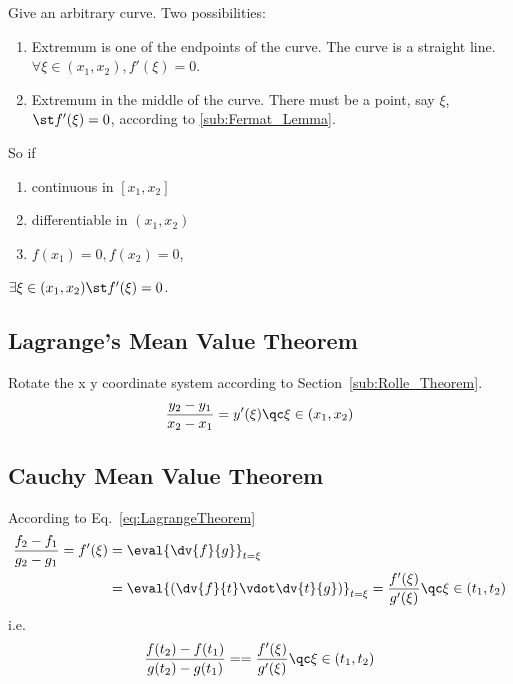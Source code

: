 Give an arbitrary curve. Two possibilities:
\begin{enumerate}
	\item Extremum is one of the endpoints of the curve. The curve is a straight line. \( \forall \xi \in (x_1, x_2), f'(\xi) = 0 \).
	\item Extremum in the middle of the curve. There must be a point, say \( \xi \), \( \st f'(\xi) = 0 \), according to \cref{sub:Fermat_Lemma}.
\end{enumerate}

So if 
\begin{enumerate}
	\item continuous in \( [x_1, x_2] \) 
	\item differentiable in \( (x_1, x_2) \) 
	\item \( f(x_1) = 0, f(x_2) = 0 \),
\end{enumerate}
\( \exists \xi \in (x_1, x_2) \st f'(\xi) = 0 \).
\subsection{Lagrange's Mean Value Theorem}%
Rotate the x y coordinate system according to Section~\ref{sub:Rolle_Theorem}.
\begin{equation}
	\frac{y_2 - y_1}{x_2 - x_1} = y'(\xi) \qc \xi \in (x_1, x_2) %
	\label{eq:LagrangeTheorem}
\end{equation}


\subsection{Cauchy Mean Value Theorem}%
	According to Eq.~\eqref{eq:LagrangeTheorem} 
\begin{equation*}
\begin{aligned}
	\frac{f_2 - f_1}{g_2 - g_1} = f'(\xi) &= \eval{\dv{f}{g}}_{t = \xi} \\ %
	&= \eval{\left(\dv{f}{t} \vdot
	\dv{t}{g}\right)}_{t = \xi} 
	= \frac{f'(\xi)}{g'(\xi)}
	\qc \xi \in (t_1,t_2)
\end{aligned}
\end{equation*}
i.e.
\begin{equation}
	\frac{f(t_2) - f(t_1)}{g(t_2) - g(t_1)} = 
	= \frac{f'(\xi)}{g'(\xi)}
	\qc \xi \in (t_1,t_2)
\end{equation}

